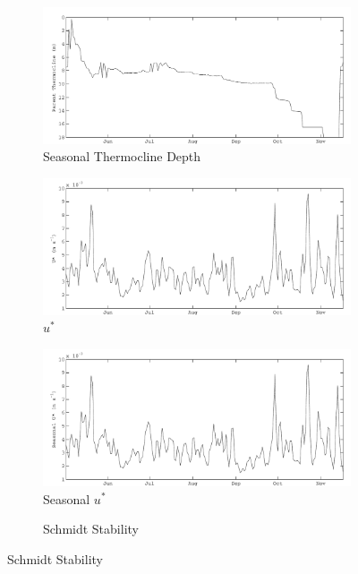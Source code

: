 \begin{figure}
  \begin{subfigure}{\lafigsize}
    \caption{\label{fig:la:out:SthermD}Seasonal Thermocline Depth}
    \includegraphics[width = \linewidth]{figures/Sparkling_SthermD.pdf}
  \end{subfigure}
  \begin{subfigure}{\lafigsize}
    \caption{\label{fig:la:out:uSt}$u^{*}$}
    \includegraphics[width = \linewidth]{figures/Sparkling_uSt.pdf}
  \end{subfigure}
  \begin{subfigure}{\lafigsize}
    \caption{\label{fig:la:out:SuSt}Seasonal $u^{*}$}
    \includegraphics[width = \linewidth]{figures/Sparkling_SuSt.pdf}
  \end{subfigure}
  \begin{subfigure}{\lafigsize}
    \caption{\label{fig:la:out:St}Schmidt Stability}

\end{subfigure}
\end{figure}
